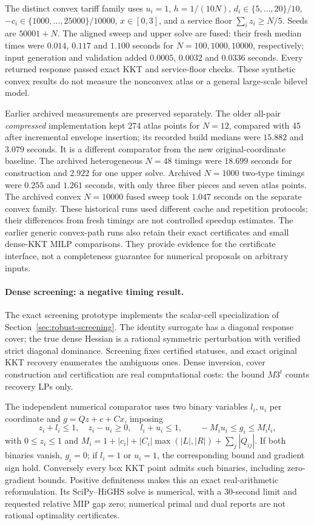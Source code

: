 The distinct convex tariff family uses $u_i=1$, $h=1/(10N)$,
$d_i\in\{5,\ldots,20\}/10$, $-c_i\in\{1000,\ldots,25000\}/10000$,
$x\in[0,3]$, and a service floor $\sum_i z_i\ge N/5$. Seeds are $50001+N$.
The aligned sweep and upper solve are fused: their fresh median times were
$0.014$, $0.117$ and $1.100$ seconds for $N=100,1000,10000$, respectively;
input generation and validation added $0.0005$, $0.0032$ and $0.0336$ seconds.
Every returned response passed exact KKT and service-floor checks. These
synthetic convex results do not measure the nonconvex atlas or a general
large-scale bilevel model.

Earlier archived measurements are preserved separately. The older all-pair
\emph{compressed} implementation kept 274 atlas points for $N=12$, compared
with 45 after incremental envelope insertion; its recorded build medians
were $15.882$ and $3.079$ seconds. It is a different comparator from the new
original-coordinate baseline. The archived heterogeneous $N=48$ timings were
$18.699$ seconds for construction and $2.922$ for one upper solve. Archived
$N=1000$ two-type timings were $0.255$ and $1.261$ seconds, with only three
fiber pieces and seven atlas points. The archived convex $N=10000$ fused sweep
took $1.047$ seconds on the separate convex family. These historical runs used
different cache and repetition protocols; their differences from fresh timings
are not controlled speedup estimates. The earlier generic convex-path runs
also retain their exact certificates and small dense-KKT MILP comparisons.
They provide evidence for the certificate interface, not a completeness
guarantee for numerical proposals on arbitrary inputs.

\paragraph{Dense screening: a negative timing result.}\label{para:screening-results}
The exact screening prototype implements the scalar-cell specialization of
Section~\ref{sec:robust-screening}. The identity surrogate has a diagonal
response cover; the true dense Hessian is a rational symmetric perturbation
with verified strict diagonal dominance. Screening fixes certified statuses,
and exact original KKT recovery enumerates the ambiguous ones. Dense inversion,
cover construction and certification are real computational costs: the bound
$M3^t$ counts recovery LPs only.

The independent numerical comparator uses two binary variables $l_i,u_i$ per
coordinate and $g=Qz+c+Cx$, imposing
\[
 z_i+l_i\le1,\quad z_i-u_i\ge0,\quad l_i+u_i\le1,
 \qquad -M_i u_i\le g_i\le M_i l_i,
\]
with $0\le z_i\le1$ and
$M_i=1+|c_i|+|C_i|\max(|L|,|R|)+\sum_j|Q_{ij}|$.
If both binaries vanish, $g_i=0$; if $l_i=1$ or $u_i=1$, the corresponding
bound and gradient sign hold. Conversely every box KKT point admits such
binaries, including zero-gradient bounds. Positive definiteness makes this an
exact real-arithmetic reformulation. Its SciPy--HiGHS solve is numerical,
with a 30-second limit and requested relative MIP gap zero; numerical primal
and dual reports are not rational optimality certificates.

